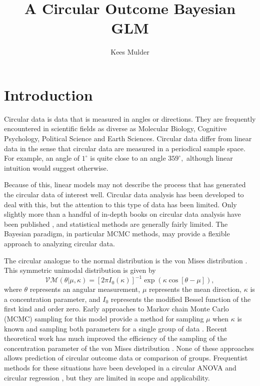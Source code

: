 \documentclass[12pt,a4paper]{article}\usepackage[]{graphicx}\usepackage[]{color}
\author{Kees Mulder}
\title{A Circular Outcome Bayesian GLM}
\begin{document}
\maketitle


\tableofcontents


\newpage




\section{Introduction}

Circular data is data that is measured in angles or directions. They are frequently encountered in scientific fields as diverse as Molecular Biology, Cognitive Psychology, Political Science \citep{gill2010} and Earth Sciences. Circular data differ from linear data in the sense that circular data are measured in a periodical sample space. For example, an angle of $1^{\circ}$ is quite close to an angle $359^{\circ},$ although linear intuition would suggest otherwise.

Because of this, linear models may not describe the process that has generated the circular data of interest well. Circular data analysis has been developed to deal with this, but the attention to this type of data has been limited. Only slightly more than a handful of in-depth books on circular data analysis have been published \citep{fisher1995statistical,mardia1999directional,pewsey2013circular}, and statistical methods are generally fairly limited. The Bayesian paradigm, in particular MCMC methods, may provide a flexible approach to analyzing circular data.

The circular analogue to the normal distribution is the von Mises distribution \citep{von1918ganzzahligkeit}. This symmetric unimodal distribution is given by
\begin{equation}
\mathcal{VM}(\theta \vert \mu, \kappa) = \left[ 2 \pi I_0(\kappa) \right]^{-1}
\exp \left( \kappa \cos \left[ \theta - \mu \right] \right),
\end{equation}
where $\theta$ represents an angular measurement, $\mu$ represents the mean direction, $\kappa$ is a concentration parameter, and $I_0$ represents the modified Bessel function of the first kind and order zero. Early approaches to Markov chain Monte Carlo (MCMC) sampling for this model provide a method for sampling $\mu$ when $\kappa$ is known \citep{mardia1976bayesian} and sampling both parameters for a single group of data \citep{damien1999fullbayes}. Recent theoretical work has much improved the efficiency of the sampling of the concentration parameter of the von Mises distribution \citep{forbes2014fast}. None of these approaches allows prediction of circular outcome data or comparison of groups. Frequentist methods for these situations have been developed in a circular ANOVA \citep{harrison1986analysis,harrison1988development} and circular regression \citep{fisher1992regression}, but they are limited in scope and applicability.
\end{document}
